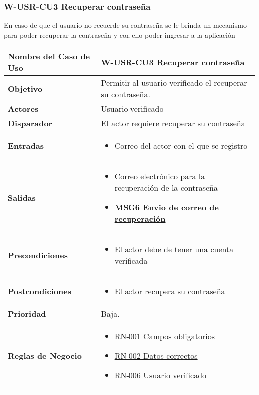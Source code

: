 \subsubsection{W-USR-CU3 Recuperar contraseña}
En caso de que el usuario no recuerde su contraseña se le brinda un mecanismo para poder recuperar la contraseña y con ello poder ingresar a la aplicación
\begin{longtable}{|J{5cm}|J{10.3cm}|}
	\hline
	\textbf{Nombre del Caso de Uso} &
		W-USR-CU3 Recuperar contraseña \\ \hline
	\textbf{Objetivo} &
		Permitir al usuario verificado el recuperar su contraseña. \\ \hline
	\textbf{Actores} &
		Usuario verificado \\ \hline 
	\textbf{Disparador} & 
		El actor requiere recuperar su contraseña \\ \hline 
	\textbf{Entradas} & 
		\begin{itemize}
				\item Correo del actor con el que se registro
		\end{itemize}\\ \hline 
	\textbf{Salidas} &
    	\begin{itemize}
		\item Correo electrónico para la recuperación de la contraseña
		\item \hyperref[MSG6]{\bf MSG6 Envio de correo de recuperación}
		\end{itemize} \\ \hline
	\textbf{Precondiciones} &
		\begin{itemize}
				\item El actor debe de tener una cuenta verificada
		\end{itemize} \\ \hline
	\textbf{Postcondiciones} &
		\begin{itemize}
			\item El actor recupera su contraseña
		\end{itemize}\\ \hline
	\textbf{Prioridad} & 
		Baja. \\ \hline
	\textbf{Reglas de Negocio} & 
		\begin{itemize}
			\item \hyperref[RN001]{RN-001 Campos obligatorios}
			\item \hyperref[RN002]{RN-002 Datos correctos}
			\item \hyperref[RN006]{RN-006 Usuario verificado}
		\end{itemize} \\ \hline

\end{longtable}
